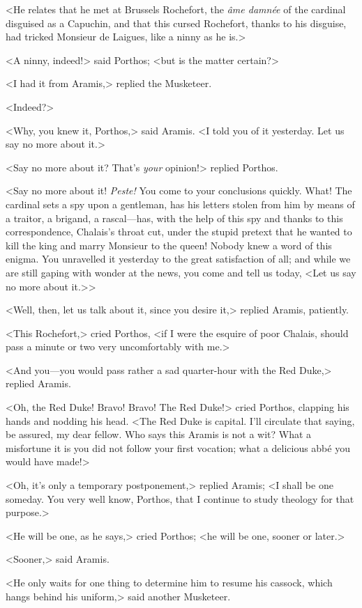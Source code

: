 <He relates that he met at Brussels Rochefort, the \textit{âme damnée} of the cardinal disguised as a Capuchin, and that this cursed Rochefort, thanks to his disguise, had tricked Monsieur de Laigues, like a ninny as he is.> 

<A ninny, indeed!> said Porthos; <but is the matter certain?> 

<I had it from Aramis,> replied the Musketeer. 

<Indeed?> 

<Why, you knew it, Porthos,> said Aramis. <I told you of it yesterday. Let us say no more about it.> 

<Say no more about it? That's \textit{your} opinion!> replied Porthos. 

<Say no more about it! \textit{Peste!} You come to your conclusions quickly. What! The cardinal sets a spy upon a gentleman, has his letters stolen from him by means of a traitor, a brigand, a rascal---has, with the help of this spy and thanks to this correspondence, Chalais's throat cut, under the stupid pretext that he wanted to kill the king and marry Monsieur to the queen! Nobody knew a word of this enigma. You unravelled it yesterday to the great satisfaction of all; and while we are still gaping with wonder at the news, you come and tell us today, <Let us say no more about it.>>

<Well, then, let us talk about it, since you desire it,> replied Aramis, patiently. 

<This Rochefort,> cried Porthos, <if I were the esquire of poor Chalais, should pass a minute or two very uncomfortably with me.> 

<And you---you would pass rather a sad quarter-hour with the Red Duke,> replied Aramis. 

<Oh, the Red Duke! Bravo! Bravo! The Red Duke!> cried Porthos, clapping his hands and nodding his head. <The Red Duke is capital. I'll circulate that saying, be assured, my dear fellow. Who says this Aramis is not a wit? What a misfortune it is you did not follow your first vocation; what a delicious abbé you would have made!> 

<Oh, it's only a temporary postponement,> replied Aramis; <I shall be one someday. You very well know, Porthos, that I continue to study theology for that purpose.> 

<He will be one, as he says,> cried Porthos; <he will be one, sooner or later.> 

<Sooner,> said Aramis. 

<He only waits for one thing to determine him to resume his cassock, which hangs behind his uniform,> said another Musketeer. 

